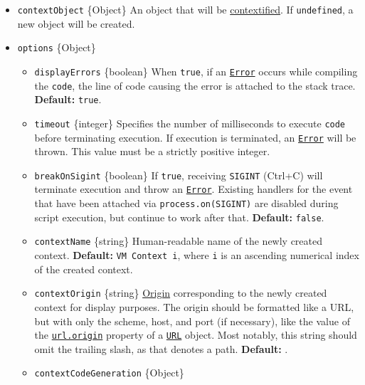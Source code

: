 \begin{itemize}
\tightlist
\item
  \texttt{contextObject} \{Object\} An object that will be
  \hyperref[what-does-it-mean-to-contextify-an-object]{contextified}. If
  \texttt{undefined}, a new object will be created.
\item
  \texttt{options} \{Object\}

  \begin{itemize}
  \tightlist
  \item
    \texttt{displayErrors} \{boolean\} When \texttt{true}, if an
    \href{errors.md\#class-error}{\texttt{Error}} occurs while compiling
    the \texttt{code}, the line of code causing the error is attached to
    the stack trace. \textbf{Default:} \texttt{true}.
  \item
    \texttt{timeout} \{integer\} Specifies the number of milliseconds to
    execute \texttt{code} before terminating execution. If execution is
    terminated, an \href{errors.md\#class-error}{\texttt{Error}} will be
    thrown. This value must be a strictly positive integer.
  \item
    \texttt{breakOnSigint} \{boolean\} If \texttt{true}, receiving
    \texttt{SIGINT} (Ctrl+C) will terminate execution and throw an
    \href{errors.md\#class-error}{\texttt{Error}}. Existing handlers for
    the event that have been attached via
    \texttt{process.on(\textquotesingle{}SIGINT\textquotesingle{})} are
    disabled during script execution, but continue to work after that.
    \textbf{Default:} \texttt{false}.
  \item
    \texttt{contextName} \{string\} Human-readable name of the newly
    created context. \textbf{Default:}
    \texttt{\textquotesingle{}VM\ Context\ i\textquotesingle{}}, where
    \texttt{i} is an ascending numerical index of the created context.
  \item
    \texttt{contextOrigin} \{string\}
    \href{https://developer.mozilla.org/en-US/docs/Glossary/Origin}{Origin}
    corresponding to the newly created context for display purposes. The
    origin should be formatted like a URL, but with only the scheme,
    host, and port (if necessary), like the value of the
    \href{url.md\#urlorigin}{\texttt{url.origin}} property of a
    \href{url.md\#class-url}{\texttt{URL}} object. Most notably, this
    string should omit the trailing slash, as that denotes a path.
    \textbf{Default:} \texttt{\textquotesingle{}\textquotesingle{}}.
  \item
    \texttt{contextCodeGeneration} \{Object\}


\end{itemize}
\end{itemize}
